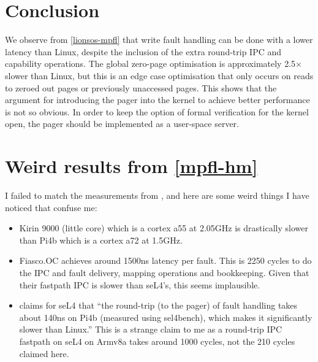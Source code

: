 \documentclass{article}
\begin{document}
\section{Conclusion}
We observe from \autoref{lionsos-mpfl} that write fault handling can be done with a lower latency than Linux, despite the inclusion of the extra round-trip IPC and capability operations. The global zero-page optimisation is approximately 2.5$\times$ slower than Linux, but this is an edge case optimisation that only occurs on reads to zeroed out pages or previously unaccessed pages. 
This shows that the argument for introducing the pager into the kernel to achieve better performance is not so obvious. In order to keep the option of formal verification for the kernel open, the pager should be implemented as a user-space server.

\section{Weird results from \autoref{mpfl-hm}}
I failed to match the measurements from \citet{Chen_JWLLLWHLYWYPX_24}, and here are some weird things I have noticed that confuse me:
\begin{itemize}
    \item Kirin 9000 (little core) which is a cortex a55 at 2.05GHz is drastically slower than Pi4b which is a cortex a72 at 1.5GHz.
    \item Fiasco.OC achieves around 1500ns latency per fault. This is 2250 cycles to do the IPC and fault delivery, mapping operations and bookkeeping. Given that their fastpath IPC is slower than seL4's, this seems implausible.
    \item \citet{Chen_JWLLLWHLYWYPX_24} claims for seL4 that ``the round-trip (to the pager) of fault handling takes about 140ns on Pi4b (measured using sel4bench), which makes it significantly slower than Linux.'' This is a strange claim to me as a round-trip IPC fastpath on seL4 on Armv8a takes around 1000 cycles, not the 210 cycles claimed here.
\end{itemize}


\end{document}
